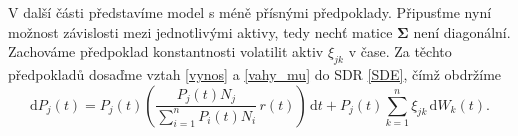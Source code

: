\documentclass[a4paper,12pt]{report}
\theoremstyle{definition} \newtheorem{definice}[veta]{Definice}
\theoremstyle{remark}
\begin{document}

V další části představíme model s méně přísnými předpoklady.
Připusťme nyní možnost závislosti mezi jednotlivými aktivy, tedy nechť matice $\boldsymbol{\Sigma}$ není diagonální.
Zachováme předpoklad konstantnosti volatilit aktiv $\xi_{jk}$ v čase.
Za těchto předpokladů dosaďme vztah \eqref{vynos} a \eqref{vahy_mu} do SDR \eqref{SDE}, čímž obdržíme
\begin{equation} 
 \mathrm{d}P_j(t)=P_j(t)\left(\frac{P_j(t)N_j}{\sum_{i=1}^n P_i(t)N_i}\, r(t)\right)\,\mathrm{d}t+P_j(t)\sum_{k=1}^{n}\xi_{jk}\,\mathrm{d}W_k(t).
\end{equation}
\end{document}
